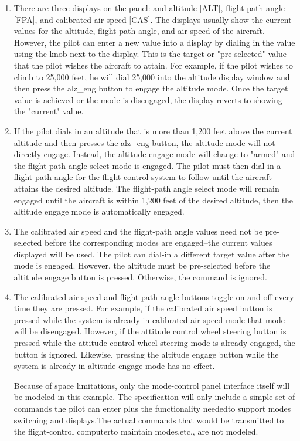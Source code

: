 \documentclass{article}
\begin{document}
\begin{enumerate}
\item There are three displays on the panel: and altitude [ALT], flight path angle [FPA], and
calibrated air speed [CAS]. The displays usually show the current values for the altitude, flight
path angle, and air speed of the aircraft. However, the pilot can enter a new value into a display by dialing in the value using the knob next to the display. This is the target or "pre-selected" value that the pilot wishes the aircraft to attain. For example, if the pilot wishes to climb to 25,000 feet, he will dial 25,000 into the altitude display window and then press the alz\_eng button to engage the altitude mode. Once the target value is achieved or the mode is disengaged, the display reverts to showing the "current" value.

\item If the pilot dials in an altitude that is more than 1,200 feet above the current altitude and
then presses the alz\_eng button, the altitude mode will not directly engage. Instead, the altitude
engage mode will change to "armed" and the flight-path angle select mode is engaged. The pilot
must then dial in a flight-path angle for the flight-control system to follow until the aircraft attains the desired altitude. The flight-path angle select mode will remain engaged until the aircraft is within 1,200 feet of the desired altitude, then the altitude engage mode is automatically engaged.

\item The calibrated air speed and the flight-path angle values need not be pre-selected before the
corresponding modes are engaged--the current values displayed will be used. The pilot can dial-in
a different target value after the mode is engaged. However, the altitude must be pre-selected
before the altitude engage button is pressed. Otherwise, the command is ignored.

\item The calibrated air speed and flight-path angle buttons toggle on and off every time they are
pressed. For example, if the calibrated air speed button is pressed while the system is already in
calibrated air speed mode that mode will be disengaged. However, if the attitude control wheel
steering button is pressed while the attitude control wheel steering mode is already engaged, the
button is ignored. Likewise, pressing the altitude engage button while the system is already in
altitude engage mode has no effect.

Because of space limitations, only the mode-control panel interface itself will be modeled in this
example. The specification will only include a simple set of commands the pilot can enter plus the functionality neededto support modes switching and displays.The actual commands that would
be transmitted to the flight-control computerto maintain modes,etc., are not modeled.

\end{enumerate}
\end{document}
